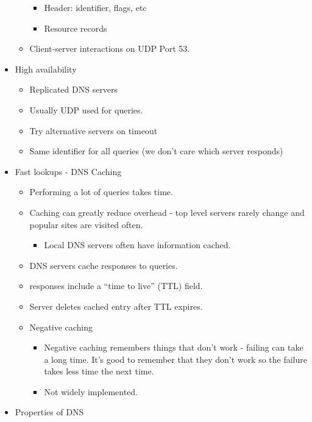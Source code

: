 \begin{itemize}
\begin{itemize}
    \begin{itemize}
    \tightlist
    \item
      Header: identifier, flags, etc
    \item
      Resource records
    \end{itemize}
  \item
    Client-server interactions on UDP Port 53.
  \end{itemize}
\item
  High availability

  \begin{itemize}
  \tightlist
  \item
    Replicated DNS servers
  \item
    Usually UDP used for queries.
  \item
    Try alternative servers on timeout
  \item
    Same identifier for all queries (we don't care which server
    responds)
  \end{itemize}
\item
  Fast lookups - DNS Caching

  \begin{itemize}
  \tightlist
  \item
    Performing a lot of queries takes time.
  \item
    Caching can greatly reduce overhead - top level servers rarely
    change and popular sites are visited often.

    \begin{itemize}
    \tightlist
    \item
      Local DNS servers often have information cached.
    \end{itemize}
  \item
    DNS servers cache responses to queries.
  \item
    responses include a ``time to live'' (TTL) field.
  \item
    Server deletes cached entry after TTL expires.
  \item
    Negative caching

    \begin{itemize}
    \tightlist
    \item
      Negative caching remembers things that don't work - failing can
      take a long time. It's good to remember that they don't work so
      the failure takes less time the next time.
    \item
      Not widely implemented.
    \end{itemize}
  \end{itemize}
\item
  Properties of DNS


\end{itemize}
